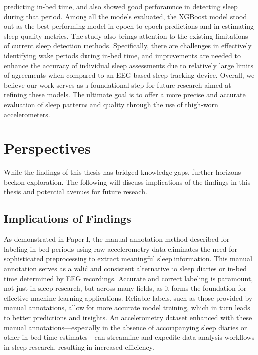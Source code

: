 \documentclass[
  10pt,
]{scrbook}
\begin{document}
\begin{itemize}
  predicting in-bed time, and also showed good perforamnce in detecting
  sleep during that period. Among all the models evaluated, the XGBoost
  model stood out as the best performing model in epoch-to-epoch
  predictions and in estimating sleep quality metrics. The study also
  brings attention to the existing limitations of current sleep
  detection methods. Specifically, there are challenges in effectively
  identifying wake periods during in-bed time, and improvements are
  needed to enhance the accuracy of individual sleep assessments due to
  relatively large limits of agreements when compared to an EEG-based
  sleep tracking device. Overall, we believe our work serves as a
  foundational step for future research aimed at refining these models.
  The ultimate goal is to offer a more precise and accurate evaluation
  of sleep patterns and quality through the use of thigh-worn
  accelerometers.
\end{itemize}

\hypertarget{perspectives}{%
\chapter{Perspectives}\label{perspectives}}

While the findings of this thesis has bridged knowledge gaps, further
horizons beckon exploration. The following will discuss implications of
the findings in this thesis and potential avenues for future reseach.

\hypertarget{implications-of-findings}{%
\section{Implications of Findings}\label{implications-of-findings}}

As demonstrated in Paper I, the manual annotation method described for
labeling in-bed periods using raw accelerometry data eliminates the need
for sophisticated preprocessing to extract meaningful sleep information.
This manual annotation serves as a valid and consistent alternative to
sleep diaries or in-bed time determined by EEG recordings. Accurate and
correct labeling is paramount, not just in sleep research, but across
many fields, as it forms the foundation for effective machine learning
applications. Reliable labels, such as those provided by manual
annotations, allow for more accurate model training, which in turn leads
to better predictions and insights. An accelerometry dataset enhanced
with these manual annotations---especially in the absence of
accompanying sleep diaries or other in-bed time estimates---can
streamline and expedite data analysis workflows in sleep research,
resulting in increased efficiency.
\end{document}
